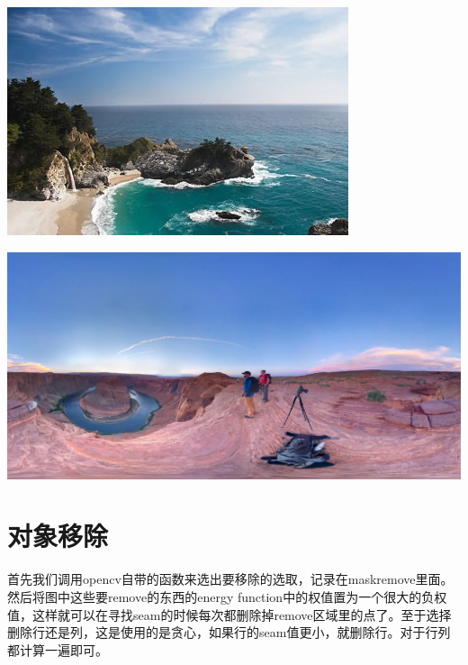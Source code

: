 \documentclass[10pt, a4paper]{article}
\begin{document}
    \includegraphics[scale = .3]{4Amplify.jpg}

    \includegraphics[scale = .3]{5Amplify.jpg}

  \section{对象移除}
    首先我们调用opencv自带的函数来选出要移除的选取，记录在maskremove里面。然后将图中这些要remove的东西的energy function中的权值置为一个很大的负权值，这样就可以在寻找seam的时候每次都删除掉remove区域里的点了。至于选择删除行还是列，这是使用的是贪心，如果行的seam值更小，就删除行。对于行列都计算一遍即可。
\end{document}
